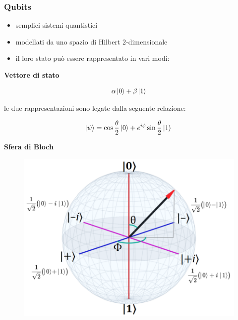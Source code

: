 \documentclass[aspectratio=169]{beamer}
\begin{document}
\begin{frame}
	\frametitle{Qubits}
	\begin{itemize}
		\item semplici sistemi quantistici
		      \pause
		\item modellati da uno spazio di Hilbert 2-dimensionale
		      \pause
		\item il loro stato può essere rappresentato in vari modi:

	\end{itemize}

	\vspace{10pt}

	\noindent
	\begin{minipage}{0.5\textwidth}
		\begin{center}
			\textbf{Vettore di stato}
		\end{center}
		\begin{equation*}
			\alpha \ket{0} + \beta \ket{1}
		\end{equation*}
		\vspace{10pt}

		le due rappresentazioni sono legate dalla seguente relazione:

		\begin{equation*}
			\ket{\psi} = \cos{\dfrac{\theta}{2}}\ket{0}+e^{i\phi}\sin{\dfrac{\theta}{2}}\ket{1} \\
		\end{equation*}
	\end{minipage}
	\hfill
	\begin{minipage}{0.48\textwidth}
		\begin{center}
			\textbf{Sfera di Bloch}
		\end{center}
		\begin{figure}
			\includegraphics[scale=0.3]{bloch-sphere.png}
		\end{figure}
	\end{minipage}
\end{frame}
\end{document}

